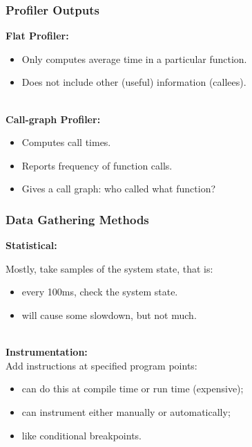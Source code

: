 \begin{frame}
  \frametitle{Profiler Outputs}

\Large
\begin{changemargin}{.5cm}
  
  {\bf Flat Profiler:}

  \begin{itemize}
    \item Only computes average time in a particular function.
    \item Does not include other (useful) information (callees).
  \end{itemize}

~\\[1em]

  {\bf Call-graph Profiler:}

  \begin{itemize}
    \item Computes call times.
    \item Reports frequency of function calls.
    \item Gives a call graph: who called what function?
  \end{itemize}
  \end{changemargin}
\end{frame}

\begin{frame}
  \frametitle{Data Gathering Methods}

\large
\begin{changemargin}{1.5cm}
  {\bf Statistical:}

  Mostly, take samples of the system state, that is:
  \begin{itemize}
    \item every 100ms, check the system state.
    \item will cause some slowdown, but not much.
  \end{itemize}
~\\[1em]

  {\bf Instrumentation:}\\
  Add instructions at specified program points:
  \begin{itemize}
    \item can do this at compile time or run time (expensive);
    \item can instrument either manually or automatically;
    \item like conditional breakpoints.
  \end{itemize}
  \end{changemargin}
\end{frame}

